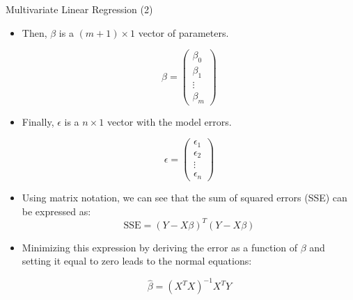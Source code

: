 \documentclass[handout]{beamer}
\begin{document}
\begin{frame}{Multivariate Linear Regression (2)}
\scriptsize{
\begin{itemize}
 \item Then, $\beta$ is a $(m+1) \times 1$ vector of parameters.

\begin{displaymath}
 \beta =
 \begin{pmatrix}
  \beta_{0}  \\
  \beta_{1}  \\
  \vdots    \\
  \beta_{m} 
 \end{pmatrix}
\end{displaymath}


\item Finally, $\epsilon$  is a $n \times 1$ vector with the model errors. 

\begin{displaymath}
 \epsilon =
 \begin{pmatrix}
  \epsilon_{1}  \\
  \epsilon_{2}  \\
  \vdots    \\
  \epsilon_{n} 
 \end{pmatrix}
\end{displaymath}

\item  Using matrix notation, we can see that the sum of squared errors (SSE) can be expressed as:
\begin{displaymath}
 \text{SSE} = (Y - X\beta)^{T}(Y-X\beta)
\end{displaymath}

\item Minimizing this expression by deriving the error as a function of $\beta$ and setting it equal to zero leads to the normal equations:

\begin{displaymath}
   \hat{\beta} = (X^{T}X)^{-1} X^{T}Y
\end{displaymath}


\end{itemize}


}

\end{frame}
\end{document}
